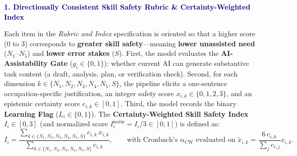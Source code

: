 \documentclass[9pt,letterpaper]{extarticle}
\begin{document}
\vspace{1.5pt}
{\normalsize\sffamily\bfseries\textcolor{navy}{1. Directionally Consistent Skill Safety Rubric \& Certainty-Weighted Index}}

Each item in the \emph{Rubric and Index} specification is oriented so that a higher score ($0$ to $3$) corresponds to \textbf{greater skill safety}---meaning \textbf{lower unassisted need} ($N_1\text{--}N_5$) and \textbf{lower error stakes} ($S$). First, the model evaluates the \textbf{AI-Assistability Gate} ($g_i \in \{0,1\}$): whether current AI can generate substantive task content (a draft, analysis, plan, or verification check). Second, for each dimension $k \in \{N_1, N_2, N_3, N_4, N_5, S\}$, the pipeline elicits a one-sentence occupation-specific justification, an integer safety score $x_{i,k} \in \{0,1,2,3\}$, and an epistemic certainty score $c_{i,k} \in [0,1]$. Third, the model records the binary \textbf{Learning Flag} ($L_i \in \{0,1\}$). The \textbf{Certainty-Weighted Skill Safety Index} $I_i \in [0,3]$ (and normalized score $I_i^{\text{norm}} = I_i/3 \in [0,1]$) is defined as:
\begin{equation*}
I_i = \frac{\sum_{k \in \{N_1, N_2, N_3, N_4, N_5, S\}} c_{i,k} \, x_{i,k}}{\sum_{k \in \{N_1, N_2, N_3, N_4, N_5, S\}} c_{i,k}}, \qquad \text{with Cronbach's } \alpha_{\text{CW}} \text{ evaluated on } \tilde{x}_{i,k} = \frac{6 \, c_{i,k}}{\sum_{j} c_{i,j}} x_{i,k}.
\end{equation*}
\end{document}
